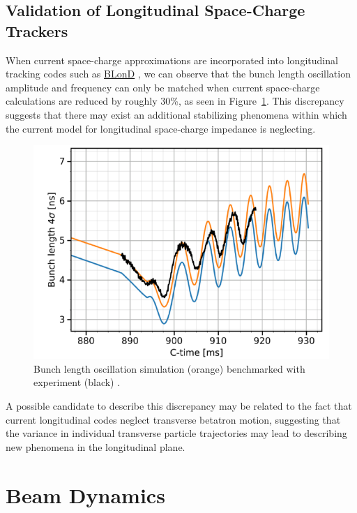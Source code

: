 \section{Validation of Longitudinal Space-Charge Trackers}

When current space-charge approximations are incorporated into longitudinal tracking codes such as \href{https://blond.web.cern.ch/}{BLonD} \cite{noauthor_cern_nodate}, we can observe that the bunch length oscillation amplitude and frequency can only be matched when current space-charge calculations are reduced by roughly 30\%, as seen in Figure~\ref{fig:BlonD_v_experiment}. This discrepancy suggests that there may exist an additional stabilizing phenomena within which the current model for longitudinal space-charge impedance is neglecting.

\begin{figure}
    \centering
    \includegraphics{figs/simulation_v_experiment.png}
    \caption{Bunch length oscillation simulation (orange) benchmarked with experiment (black) \cite{lasheen_longitudinal_2021}.}
    \label{fig:BlonD_v_experiment}
\end{figure}

A possible candidate to describe this discrepancy may be related to the fact that current longitudinal codes neglect transverse betatron motion, suggesting that the variance in individual transverse particle trajectories may lead to describing new phenomena in the longitudinal plane.

\chapter{Beam Dynamics}

